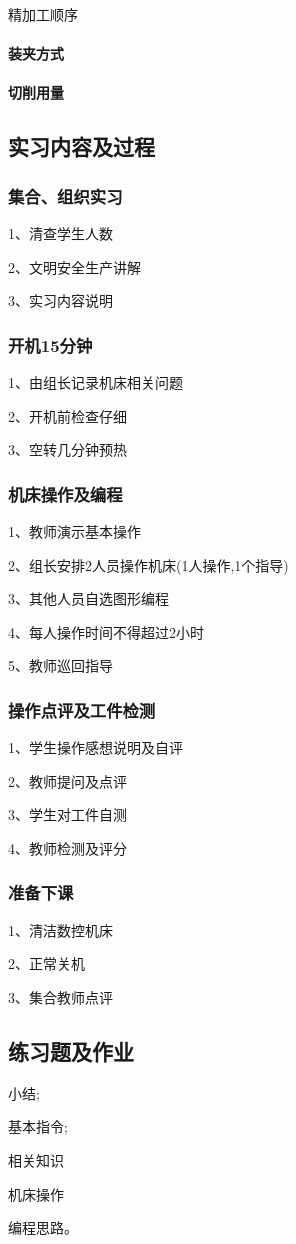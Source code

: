 精加工顺序
\paragraph{装夹方式}

\paragraph{切削用量}


\subsection{实习内容及过程}

\subsubsection{集合、组织实习}
1、清查学生人数

2、文明安全生产讲解

3、实习内容说明
\subsubsection{开机15分钟}
1、由组长记录机床相关问题

2、开机前检查仔细

3、空转几分钟预热
\subsubsection{机床操作及编程}
1、教师演示基本操作

2、组长安排2人员操作机床(1人操作,1个指导)

3、其他人员自选图形编程

4、每人操作时间不得超过2小时

5、教师巡回指导
\subsubsection{操作点评及工件检测}
1、学生操作感想说明及自评

2、教师提问及点评

3、学生对工件自测

4、教师检测及评分
\subsubsection{准备下课}
1、清洁数控机床

2、正常关机

3、集合教师点评

\subsection{练习题及作业}
\begin{compactenum}[1、]
	\item 小结;
	\item 基本指令;
	\item 相关知识
	\item 机床操作
	\item 编程思路。
\end{compactenum}

